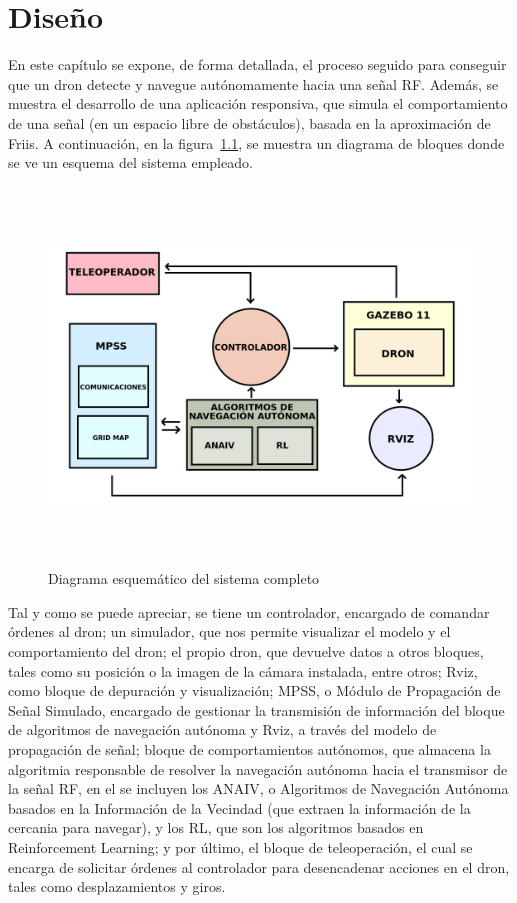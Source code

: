 \chapter{Diseño}
\label{cap:capitulo4}
\renewcommand{\tablename}{Tabla}

En este capítulo se expone, de forma detallada, el proceso seguido para conseguir que un dron detecte y navegue autónomamente hacia una señal \ac{RF}. Además, se muestra el desarrollo de una aplicación responsiva, que simula el comportamiento de una señal (en un espacio libre de obstáculos), basada en la aproximación de Friis. A continuación, en la figura~\ref{fig:diagrama}, se muestra un diagrama de bloques donde se ve un esquema del sistema empleado.\\

\begin{figure} [tp]
	\begin{center}
	\includegraphics[height=10cm]{imagenes/cap4/0_diagrama_general.png}
	\end{center}
	\caption[Diagrama esquemático del sistema completo]{Diagrama esquemático del sistema completo}
	\label{fig:diagrama}
\end{figure}

Tal y como se puede apreciar, se tiene un controlador, encargado de comandar órdenes al dron; un simulador, que nos permite visualizar el modelo y el comportamiento del dron; el propio dron, que devuelve datos a otros bloques, tales como su posición o la imagen de la cámara instalada, entre otros; Rviz, como bloque de depuración y visualización; \ac{MPSS}, o Módulo de Propagación de Señal Simulado, encargado de gestionar la transmisión de información del bloque de algoritmos de navegación autónoma y Rviz, a través del modelo de propagación de señal; bloque de comportamientos autónomos, que almacena la algoritmia responsable de resolver la navegación autónoma hacia el transmisor de la señal \ac{RF}, en el se incluyen los \ac{ANAIV}, o Algoritmos de Navegación Autónoma basados en la Información de la Vecindad (que extraen la información de la cercania para navegar), y los \ac{RL}, que son los algoritmos basados en Reinforcement Learning; y por último, el bloque de teleoperación, el cual se encarga de solicitar órdenes al controlador para desencadenar acciones en el dron, tales como desplazamientos y giros.

